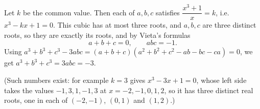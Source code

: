 Let $k$ be the common value. Then each of $a,b,c$ satisfies $\dfrac{x^3+1}{x}=k$, i.e.\ $x^3-kx+1=0$. This cubic has at most three roots, and $a,b,c$ are three distinct roots, so they are exactly its roots, and by Vieta's formulas
\[
a+b+c=0,\qquad abc=-1 .
\]
Using $a^3+b^3+c^3-3abc=(a+b+c)(a^2+b^2+c^2-ab-bc-ca)=0$, we get $a^3+b^3+c^3=3abc=\boxed{-3}$.

(Such numbers exist: for example $k=3$ gives $x^3-3x+1=0$, whose left side takes the values $-1,3,1,-1,3$ at $x=-2,-1,0,1,2$, so it has three distinct real roots, one in each of $(-2,-1)$, $(0,1)$ and $(1,2)$.)
